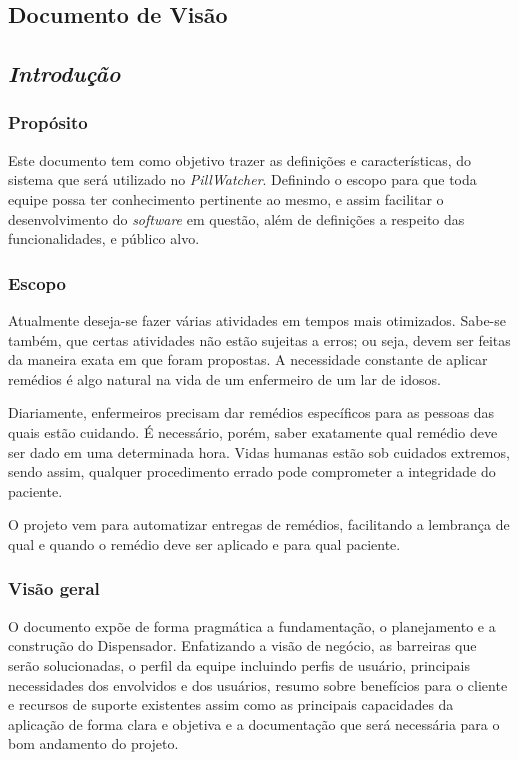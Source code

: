 \begin{apendicesenv}
\chapter{Documento de Visão}

\section{\textit{Introdução}}

\subsection*{Propósito}

Este documento tem como objetivo trazer as definições e características, do sistema
que será utilizado no \textit{PillWatcher}. Definindo o escopo para que toda equipe possa ter conhecimento pertinente ao mesmo, e assim facilitar o desenvolvimento do \textit{software} em questão, além de definições a respeito das funcionalidades, e público alvo.

\subsection*{Escopo}

Atualmente deseja-se fazer várias atividades em tempos mais otimizados. Sabe-se também, que certas atividades não estão sujeitas a erros; ou seja, devem ser feitas da maneira exata em que foram propostas. A necessidade constante de aplicar remédios é algo natural na vida de um enfermeiro de um lar de idosos.

Diariamente, enfermeiros precisam dar remédios específicos para as pessoas das quais estão cuidando. É necessário, porém, saber exatamente qual remédio deve ser dado em uma determinada hora. Vidas humanas estão sob cuidados extremos, sendo assim, qualquer procedimento errado pode comprometer a integridade do paciente.

O projeto vem para automatizar entregas de remédios, facilitando a lembrança de qual e quando o remédio deve ser aplicado e para qual paciente.

\subsection*{Visão geral}

O documento expõe de forma pragmática a fundamentação, o planejamento e a construção do Dispensador. Enfatizando a visão de negócio, as barreiras que serão solucionadas, o perfil da equipe incluindo perfis de usuário, principais necessidades dos envolvidos e dos usuários, resumo sobre benefícios para o cliente e recursos de suporte existentes assim como as principais capacidades da aplicação de forma clara e objetiva e a documentação que será necessária para o bom andamento do projeto.


\end{apendicesenv}
